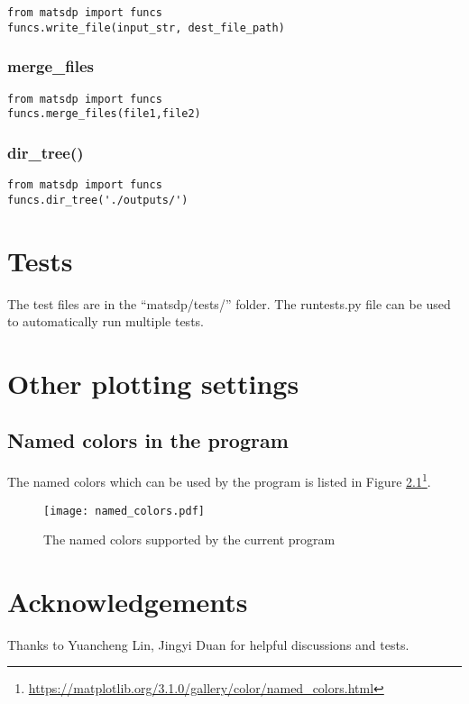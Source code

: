\documentclass[12pt]{book}
\begin{document}
\begin{lstlisting}
from matsdp import funcs
funcs.write_file(input_str, dest_file_path)
\end{lstlisting}

\subsection{merge\_files}
\begin{lstlisting}
from matsdp import funcs
funcs.merge_files(file1,file2)
\end{lstlisting}

\subsection{dir\_tree()}

\begin{lstlisting}
from matsdp import funcs
funcs.dir_tree('./outputs/')
\end{lstlisting}

\chapter{Tests}
The test files are in the ``matsdp/tests/'' folder. The runtests.py file can be used to automatically run multiple tests.


\newpage
\appendix

\chapter{Other plotting settings}


\section{\label{sec:supp}Named colors in the program}
The named colors which can be used by the program is listed in Figure \ref{fig:named_colors}\footnote{\url{https://matplotlib.org/3.1.0/gallery/color/named_colors.html}}.
\begin{figure}[htbp]
\centering
\texttt{[image: named\_colors.pdf]}
\caption{The named colors supported by the current program}
\label{fig:named_colors}
\end{figure}



\chapter*{Acknowledgements}
Thanks to Yuancheng Lin, Jingyi Duan for helpful discussions and tests.
\end{document}
